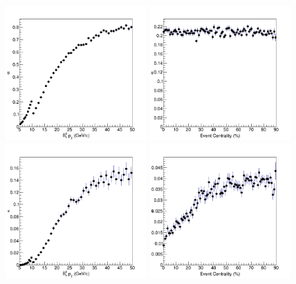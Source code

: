 \begin{figure}[h]
\begin{center}
\includegraphics[width=0.48\textwidth]{Figures/Chapter4/BsAcc1DPtHis.png}
\includegraphics[width=0.48\textwidth]{Figures/Chapter4/BsAcc1DCentHis.png}
\includegraphics[width=0.48\textwidth]{Figures/Chapter4/BsSel1DPtHis.png}
\includegraphics[width=0.48\textwidth]{Figures/Chapter4/BsSel1DCentHis.png}

\end{center}
\end{figure}
